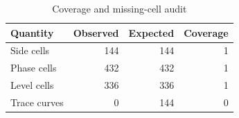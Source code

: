 \begin{table}[htbp]
\centering
\caption{Coverage and missing-cell audit}
\small
\begin{tabular}{@{}lrrr@{}}
\toprule
Quantity & Observed & Expected & Coverage \\
\midrule
Side cells & 144 & 144 & 1 \\
Phase cells & 432 & 432 & 1 \\
Level cells & 336 & 336 & 1 \\
Trace curves & 0 & 144 & 0 \\
\bottomrule
\end{tabular}
\end{table}
